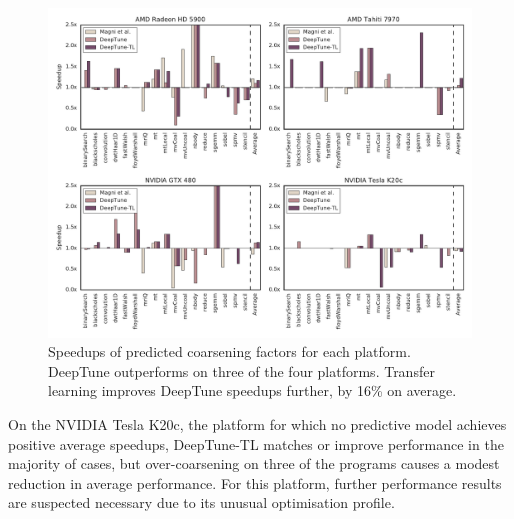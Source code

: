\begin{figure}
  \centering %
  \includegraphics[width=\textwidth]{img/pact-speedup}%
  \caption[Speedups of predicted thread coarsening factors]{%
    Speedups of predicted coarsening factors for each platform. DeepTune outperforms \citeauthor{Magni2014} on three of the four platforms. Transfer learning improves DeepTune speedups further, by 16\% on average.%
  }%
  \label{fig:pact-speedup}
\end{figure}

On the NVIDIA Tesla K20c, the platform for which no predictive model achieves positive average speedups, DeepTune-TL matches or improve performance in the majority of cases, but over-coarsening on three of the programs causes a modest reduction in average performance. For this platform, further performance results are suspected necessary due to its unusual optimisation profile.
